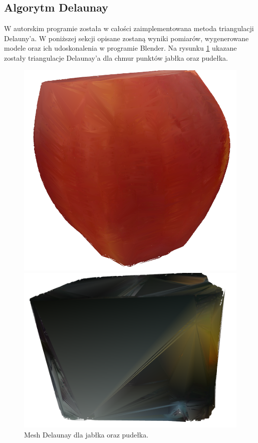 \subsection{Algorytm Delaunay}
W autorskim programie została w całości zaimplementowana metoda triangulacji Delauny'a. W poniższej sekcji opisane zostaną wyniki pomiarów, wygenerowane modele oraz ich udoskonalenia w programie Blender. Na rysunku \ref{fig:delaBoxApple} ukazane zostały triangulacje Delaunay'a dla chmur punktów jabłka oraz pudełka.
\begin{figure}[H]
\centering
    \begin{minipage}[b]{0.45\linewidth}
        \includegraphics[scale=0.3]{jablkoDelNowe.PNG}
    \end{minipage}
\quad
    \begin{minipage}[b]{0.45\linewidth}
        \includegraphics[scale=0.3]{delaunayBox.PNG}
    \end{minipage}
\caption{Mesh Delaunay dla jabłka oraz pudełka.}
\label{fig:delaBoxApple}
\end{figure}
